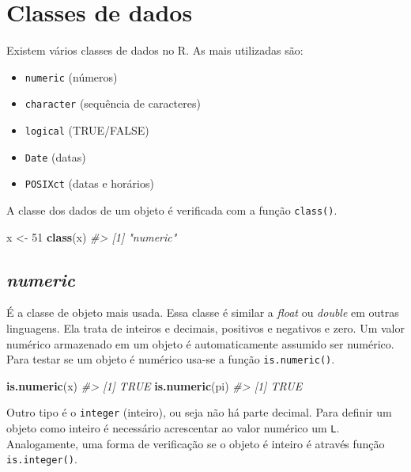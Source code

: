 \documentclass[]{book}
\newenvironment{Shaded}{\begin{snugshade}}{\end{snugshade}}
\newcommand{\KeywordTok}[1]{\textcolor[rgb]{0.13,0.29,0.53}{\textbf{#1}}}
\newcommand{\DecValTok}[1]{\textcolor[rgb]{0.00,0.00,0.81}{#1}}
\newcommand{\StringTok}[1]{\textcolor[rgb]{0.31,0.60,0.02}{#1}}
\newcommand{\CommentTok}[1]{\textcolor[rgb]{0.56,0.35,0.01}{\textit{#1}}}
\newcommand{\NormalTok}[1]{#1}
\begin{document}
\section{Classes de dados}\label{classes-de-dados}

Existem vários classes de dados no R. As mais utilizadas são:

\begin{itemize}
\item
  \texttt{numeric} (números)
\item
  \texttt{character} (sequência de caracteres)
\item
  \texttt{logical} (TRUE/FALSE)
\item
  \texttt{Date} (datas)
\item
  \texttt{POSIXct} (datas e horários)
\end{itemize}

A classe dos dados de um objeto é verificada com a função
\texttt{class()}.

\begin{Shaded}
\begin{Highlighting}[]
\NormalTok{x <-}\StringTok{ }\DecValTok{51}
\KeywordTok{class}\NormalTok{(x)}
\CommentTok{#> [1] "numeric"}
\end{Highlighting}
\end{Shaded}

\subsection{\texorpdfstring{\emph{numeric}}{numeric}}\label{numeric}

É a classe de objeto mais usada. Essa classe é similar a \emph{float} ou
\emph{double} em outras linguagens. Ela trata de inteiros e decimais,
positivos e negativos e zero. Um valor numérico armazenado em um objeto
é automaticamente assumido ser numérico. Para testar se um objeto é
numérico usa-se a função \texttt{is.numeric()}.

\begin{Shaded}
\begin{Highlighting}[]
\KeywordTok{is.numeric}\NormalTok{(x)}
\CommentTok{#> [1] TRUE}
\KeywordTok{is.numeric}\NormalTok{(pi)}
\CommentTok{#> [1] TRUE}
\end{Highlighting}
\end{Shaded}

Outro tipo é o \texttt{integer} (inteiro), ou seja não há parte decimal.
Para definir um objeto como inteiro é necessário acrescentar ao valor
numérico um \texttt{L}. Analogamente, uma forma de verificação se o
objeto é inteiro é através função \texttt{is.integer()}.
\end{document}
